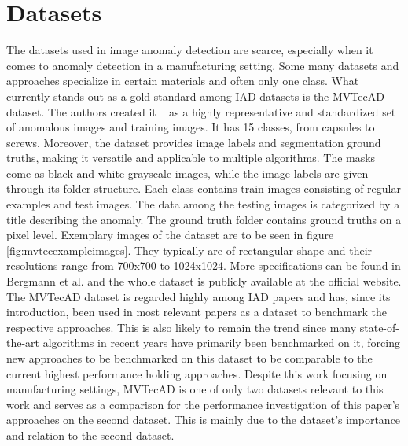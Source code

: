 \section{Datasets}
\label{sec:datasets}
The datasets used in image anomaly detection are scarce, especially when it comes to anomaly detection in a manufacturing setting. Some many datasets and approaches specialize in certain materials \cite{FabricDataset_Tsang_2016} 
\cite{SteeltubeDataset_Yang_2021} \cite{magnetictiles_Huang_2018}
and often only one class. What currently stands out as a gold standard among IAD datasets is the MVTecAD \cite{MVTEC_Bergmann_2021} dataset. The authors created it  
as a highly representative and standardized set of anomalous images and training images. It has 15 classes, from capsules to screws. Moreover, the dataset provides image labels and segmentation 
ground truths, making it versatile and applicable to multiple algorithms. The masks come as black and white grayscale images, while the image labels are given through its folder structure. 
Each class contains train images consisting of regular examples 
and test images. The data among the testing images is categorized by a title describing the anomaly. The ground truth folder contains 
ground truths on a pixel level.\newline
Exemplary images of the dataset are to be seen in figure \ref{fig:mvtecexampleimages}. They typically are of rectangular shape and their resolutions range from 
700x700 to 1024x1024. More specifications can be found in Bergmann et al. \cite{MVTEC_Bergmann_2021} and the whole dataset is publicly available at the official website\cite{mvtecdownload}.\newline
The MVTecAD\cite{MVTEC_Bergmann_2021} dataset is regarded highly among IAD papers and has, since its introduction, been used in most relevant papers as a dataset 
to benchmark the respective approaches. This is also likely to remain the trend since many state-of-the-art algorithms in recent years have primarily been benchmarked on it, forcing new approaches 
to be benchmarked on this dataset to be comparable to the current highest performance holding approaches. Despite this work focusing on manufacturing settings, MVTecAD is one of only two datasets relevant to this work 
and serves as a comparison for the performance investigation of this paper's approaches on the second dataset. This is mainly due to the dataset's importance and 
relation to the second dataset.



